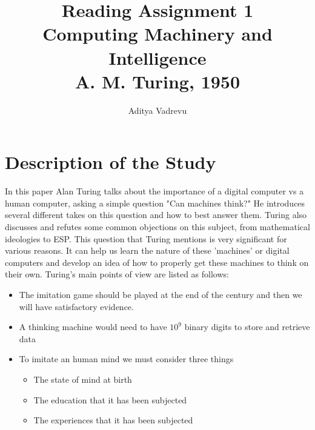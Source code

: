 \documentclass[journal, a4paper]{IEEEtran}
\begin{document}
	\title{Reading Assignment 1\\Computing Machinery and Intelligence\\ A. M. Turing, 1950}
	\author{Aditya Vadrevu}{}
	\maketitle
\section{Description of the Study} 
In this paper Alan Turing talks about the importance of a digital computer vs a human computer, asking a simple question "Can machines think?" He introduces several different takes on this question and how to best answer them. Turing also discusses and refutes some common objections on this subject, from mathematical ideologies to ESP. This question that Turing mentions is very significant for various reasons. It can help us learn the nature of these 'machines' or digital computers and develop an idea of how to properly get these machines to think on their own. Turing's main points of view are listed as follows:
\begin{itemize}
\item The imitation game should be played at the end of the century and then we will have satisfactory evidence.
\item A thinking machine would need to have $10^9$ binary digits to store and retrieve data
\item To imitate an human mind we must consider three things
	\begin{itemize}	
	\item The state of mind at birth
	\item The education that it has been subjected
	\item The experiences that it has been subjected
	\end{itemize}
\end{itemize}

\end{document}
